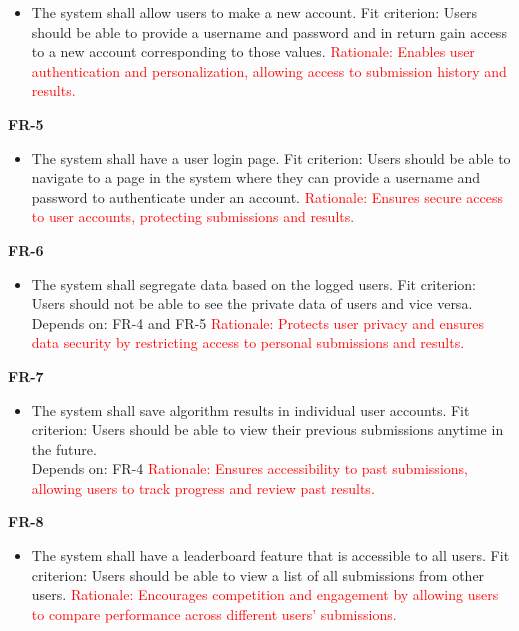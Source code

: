 \documentclass[12pt]{article}
\begin{document}
\begin{itemize}
    \item The system shall allow users to make a new account. \hfill \break
    Fit criterion: Users should be able to provide a username and password and in return gain access to a new account corresponding to those values.
    \hfill \break
    \textcolor{red} {Rationale: Enables user authentication and personalization, allowing access to submission history and results.}
\end{itemize}
\textbf{FR-5}
\begin{itemize}
    \item The system shall have a user login page. \hfill \break
    Fit criterion: Users should be able to navigate to a page in the system where they can provide a username and password to authenticate under an account.
    \hfill \break
    \textcolor{red} {Rationale: Ensures secure access to user accounts, protecting submissions and results.}
\end{itemize}
\textbf{FR-6}
\begin{itemize}
    \item The system shall segregate data based on the logged users. \hfill \break
    Fit criterion: Users should not be able to see the private data of users and vice versa. \\
    Depends on: FR-4 and FR-5
    \hfill \break
    \textcolor{red} {Rationale: Protects user privacy and ensures data security by restricting access to personal submissions and results.}
\end{itemize}
\textbf{FR-7}
\begin{itemize}
    \item The system shall save algorithm results in individual user accounts. \hfill \break
    Fit criterion: Users should be able to view their previous submissions anytime in the future. \\
    Depends on: FR-4
    \hfill \break
    \textcolor{red} {Rationale: Ensures  accessibility to past submissions, allowing users to track progress and review past results.}
\end{itemize}
\textbf{FR-8}
\begin{itemize}
    \item The system shall have a leaderboard feature that is accessible to all users. \hfill \break
    Fit criterion: Users should be able to view a list of all submissions from other users.
    \hfill \break
    \textcolor{red} {Rationale: Encourages competition and engagement by allowing users to compare performance across different users' submissions.}
\end{itemize}
\end{document}
